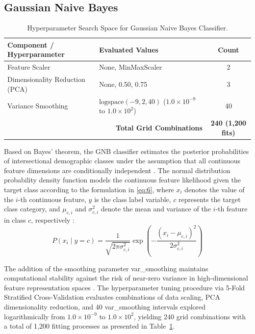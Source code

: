 \subsection{Gaussian Naive Bayes}
\label{sec:gaussian_naive_bayes}

\begin{table}[htbp]
\caption{Hyperparameter Search Space for Gaussian Naive Bayes Classifier.}
\label{tab:IV}
\centering
\begin{tabular}{llc}
\toprule
Component / Hyperparameter & Evaluated Values & Count \\
\midrule
Feature Scaler & None, MinMaxScaler & 2 \\
Dimensionality Reduction (PCA) & None, 0.50, 0.75 & 3 \\
Variance Smoothing & $\text{logspace}(-9, 2, 40)$ ($1.0 \times 10^{-9}$ to $1.0 \times 10^{2}$) & 40 \\
\midrule
\multicolumn{2}{r}{\textbf{Total Grid Combinations}} & \textbf{240 (1,200 fits)} \\
\bottomrule
\end{tabular}
\end{table}

Based on Bayes' theorem, the GNB classifier estimates the posterior probabilities of intersectional demographic classes under the assumption that all continuous feature dimensions are conditionally independent \cite{ref35}. The normal distribution probability density function models the continuous feature likelihood given the target class according to the formulation in \eqref{eq:6}, where $x_i$ denotes the value of the $i$-th continuous feature, $y$ is the class label variable, $c$ represents the target class category, and $\mu_{c,i}$ and $\sigma_{c,i}^2$ denote the mean and variance of the $i$-th feature in class $c$, respectively \cite{ref35}:
\begin{equation}
P(x_i \mid y = c) = \frac{1}{\sqrt{2\pi\sigma_{c,i}^2}} \exp\left(-\frac{(x_i - \mu_{c,i})^2}{2\sigma_{c,i}^2}\right)
\label{eq:6}
\end{equation}

The addition of the smoothing parameter var\_smoothing maintains computational stability against the risk of near-zero variance in high-dimensional feature representation spaces \cite{ref36}. The hyperparameter tuning procedure via 5-Fold Stratified Cross-Validation evaluates combinations of data scaling, PCA dimensionality reduction, and 40 var\_smoothing intervals explored logarithmically from $1.0 \times 10^{-9}$ to $1.0 \times 10^{2}$, yielding 240 grid combinations with a total of 1,200 fitting processes as presented in Table~\ref{tab:IV}.
